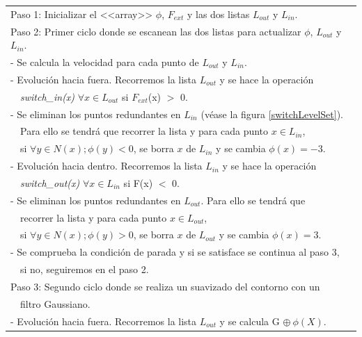 \begin{table}[H]
	\small
	\centering
	\begin{tabular}{|l|}
		\hline		
		\tabitem Paso 1: Inicializar el <<array>> $\phi$, $F_{ext}$ y las dos listas $L_{out}$ y $L_{in}$. \\
		\tabitem Paso 2: Primer ciclo donde se escanean las dos listas para actualizar $\phi$, $L_{out}$ y $L_{in}$. \\
		\quad \quad \quad \quad - Se calcula la velocidad para cada punto de $L_{out}$ y $L_{in}$. \\
		\quad \quad \quad \quad - Evoluci\'{o}n hacia fuera. Recorremos la lista $L_{out}$ y se hace  la operaci\'{o}n \\ 
		\quad \quad \quad \quad \ \ \textit{switch\_in(x)} $\forall x \in L_{out}$ si $F_{ext}$(x) $>$ 0. \\ 
		\quad \quad \quad \quad - Se eliminan los puntos redundantes en $L_{in}$ (v\'{e}ase la figura \ref{switchLevelSet}).\\ 
		\quad \quad \quad \quad \ \ Para ello se tendr\'{a} que recorrer la lista y para cada punto $x \in L_{in}$,\\
		\quad \quad \quad \quad \ \ si $\forall y \in N(x); \phi(y) < 0$, se borra $x$ de $L_{in}$ y se cambia $\phi(x) = -3$. \\ 
		\quad \quad \quad \quad - Evoluci\'{o}n hacia dentro. Recorremos la lista $L_{in}$ y se hace  la operaci\'{o}n \\ 
		\quad \quad \quad \quad \ \ \textit{switch\_out(x)} $\forall x \in L_{in}$ si F(x) $<$ 0. \\ 
		\quad \quad \quad \quad - Se eliminan los puntos redundantes en $L_{out}$. Para ello se tendr\'{a} que \\
		\quad \quad \quad \quad \ \ recorrer la lista y para cada punto $x \in L_{out}$,\\
		\quad \quad \quad \quad \ \ si $\forall y \in N(x); \phi(y) > 0$, se borra $x$ de $L_{out}$ y se cambia $\phi(x) = 3$. \\
		\quad \quad \quad \quad - Se comprueba la condici\'{o}n de parada y si se satisface se continua al paso 3, \\ 
		\quad \quad \quad \quad \ \ si no, seguiremos en el paso 2. \\
		\tabitem Paso 3: Segundo ciclo donde se realiza un suavizado del contorno con un \\ 
		\quad \quad \quad \quad \ \ filtro Gaussiano. \\
		\quad \quad \quad \quad - Evoluci\'{o}n hacia fuera. Recorremos la lista $L_{out}$ y se calcula G $\oplus \ \phi(X)$. \\ 

\end{tabular}
\end{table}

